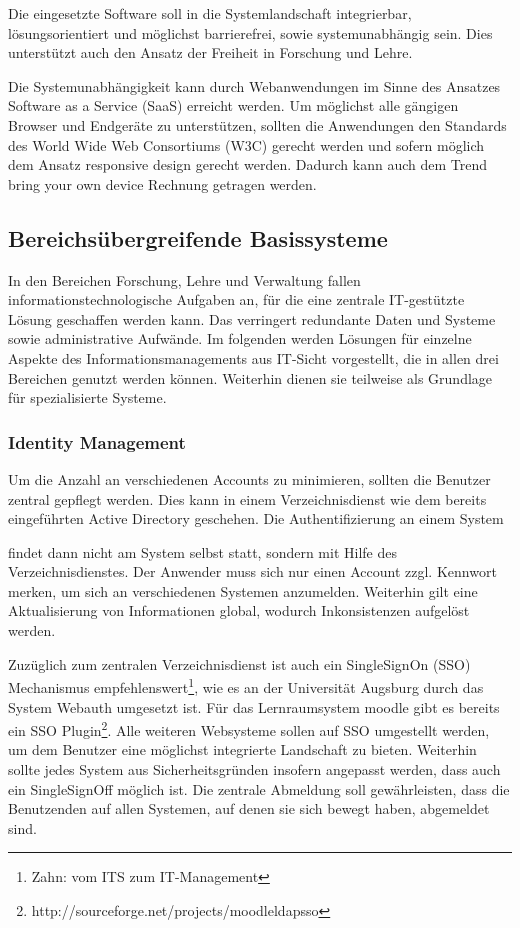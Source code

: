 \documentclass[a4paper]{article}
\begin{document}
{\sffamily
Die eingesetzte Software soll in die Systemlandschaft integrierbar, lösungsorientiert und möglichst barrierefrei, sowie
systemunabhängig sein. Dies unterstützt auch den Ansatz der Freiheit in Forschung und Lehre.}

{\sffamily
Die Systemunabhängigkeit kann durch Webanwendungen im Sinne des Ansatzes Software as a Service (SaaS) erreicht werden.
Um möglichst alle gängigen Browser und Endgeräte zu unterstützen, sollten die Anwendungen den Standards des World Wide
Web Consortiums (W3C) gerecht werden und sofern möglich dem Ansatz responsive design gerecht werden. Dadurch kann auch
dem Trend bring your own device Rechnung getragen werden.}

\subsection{Bereichsübergreifende Basissysteme}
{\sffamily
In den Bereichen Forschung, Lehre und Verwaltung fallen informationstechnologische Aufgaben an, für die eine zentrale
IT-gestützte Lösung geschaffen werden kann. Das verringert redundante Daten und Systeme sowie administrative Aufwände.
Im folgenden werden Lösungen für einzelne Aspekte des Informationsmanagements aus IT-Sicht vorgestellt, die in allen
drei Bereichen genutzt werden können. Weiterhin dienen sie teilweise als Grundlage für spezialisierte Systeme.}

\subsubsection{Identity Management}
{\sffamily
Um die Anzahl an verschiedenen Accounts zu minimieren, sollten die Benutzer zentral gepflegt werden. Dies kann in einem
Verzeichnisdienst wie dem bereits eingeführten Active Directory geschehen. Die Authentifizierung an einem System}

{\sffamily
findet dann nicht am System selbst statt, sondern mit Hilfe des Verzeichnisdienstes. Der Anwender muss sich nur einen
Account zzgl. Kennwort merken, um sich an verschiedenen Systemen anzumelden. Weiterhin gilt eine Aktualisierung von
Informationen global, wodurch Inkonsistenzen aufgelöst werden.}

{\sffamily
Zuzüglich zum zentralen Verzeichnisdienst ist auch ein SingleSignOn (SSO) Mechanismus empfehlenswert\footnote{Zahn: vom
ITS zum IT-Management}, wie es an der Universität Augsburg durch das System Webauth umgesetzt ist. Für das
Lernraumsystem moodle gibt es bereits ein SSO Plugin\footnote{http://sourceforge.net/projects/moodleldapsso}. Alle
weiteren Websysteme sollen auf SSO umgestellt werden, um dem Benutzer eine möglichst integrierte Landschaft zu bieten.
Weiterhin sollte jedes System aus Sicherheitsgründen insofern angepasst werden, dass auch ein SingleSignOff möglich
ist. Die zentrale Abmeldung soll gewährleisten, dass die Benutzenden auf allen Systemen, auf denen sie sich bewegt
haben, abgemeldet sind.}
\end{document}
